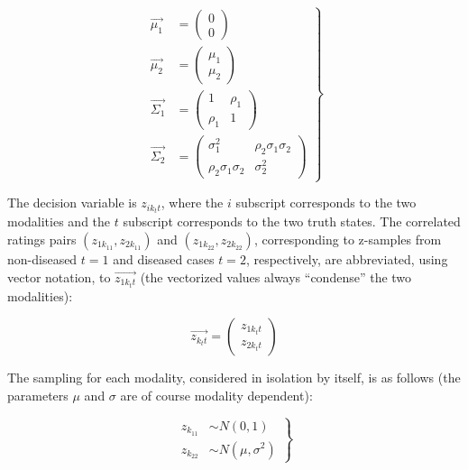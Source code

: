 \documentclass[
]{book}
\begin{document}
\begin{equation} 
\left.\begin{aligned}
\overrightarrow{
\mu_1}&=
\left( \begin{matrix}
0 \\
0
\end{matrix}
\right)\\
\overrightarrow{
\mu_2}&=
\left( \begin{matrix}
\mu_1 \\
\mu_2
\end{matrix}
\right)\\
\overrightarrow{
\Sigma_1}&=
\left( 
\begin{matrix}
1 & \rho_1 \\
\rho_1  & 1
\end{matrix}
\right) \\
\overrightarrow{
\Sigma_2} &= \left( 
\begin{matrix}
\sigma_1^2 & \rho_2 \sigma_1 \sigma_2 \\
\rho_2 \sigma_1 \sigma_2  & \sigma_2^2
\end{matrix}
\right)
\end{aligned}\right\}
\label{eq:bivariate-binormal-model-all-parameters}
\end{equation}

The decision variable is \(z_{ik_tt}\), where the \(i\) subscript corresponds to the two modalities and the \(t\) subscript corresponds to the two truth states. The correlated ratings pairs \(\left( z_{1k_11},z_{2k_11} \right)\) and \(\left( z_{1k_22},z_{2k_22} \right)\), corresponding to z-samples from non-diseased \(t = 1\) and diseased cases \(t = 2\), respectively, are abbreviated, using vector notation, to \(\overrightarrow{z_{1k_tt}}\) (the vectorized values always ``condense'' the two modalities):

\begin{equation} 
\overrightarrow{z_{k_tt}}=
\left( \begin{matrix}
z_{1k_tt}  \\
z_{2k_tt}
\end{matrix} \right)
\label{eq:bivariate-binormal-model-notation}
\end{equation}

The sampling for each modality, considered in isolation by itself, is as follows (the parameters \(\mu\) and \(\sigma\) are of course modality dependent):

\begin{equation}
\left.\begin{aligned}
z_{k_11} &\sim  N\left( 0, 1 \right) \\
z_{k_22} &\sim  N\left( \mu, \sigma^2 \right)
\end{aligned}\right\}
\label{eq:univariate-binormal-model-sampling}
\end{equation}
\end{document}
